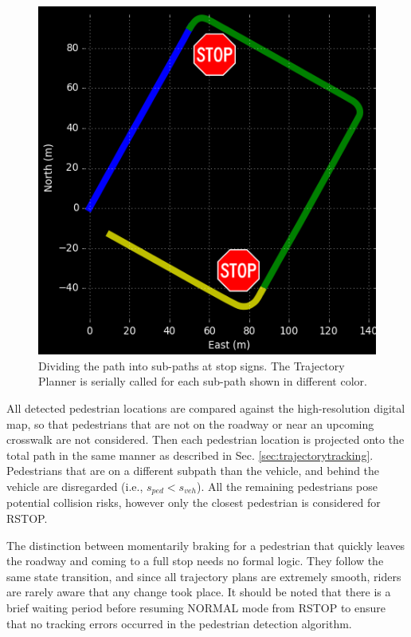 \documentclass[letterpaper, 10 pt, conference]{ieeeconf}  %
\begin{document}
\begin{figure}[thpb]
  \centering
  \includegraphics[width=0.5\columnwidth]{graphics/Subpaths.png}
  \caption{
    Dividing the path into sub-paths at stop signs.
    The Trajectory Planner is serially called for each sub-path shown in different color.
  }
  \label{fig:subpathdivision}
\end{figure}

All detected pedestrian locations are compared against the high-resolution digital map, so that pedestrians that are not on the roadway or near an upcoming crosswalk are not considered.
Then each pedestrian location is projected onto the total path in the same manner as described in Sec. \ref{sec:trajectorytracking}.
Pedestrians that are on a different subpath than the vehicle, and behind the vehicle are disregarded (i.e., $s_{ped} < s_{veh}$).
All the remaining pedestrians pose potential collision risks, however only the closest pedestrian is considered for RSTOP.

The distinction between momentarily braking for a pedestrian that quickly leaves the roadway and coming to a full stop needs no formal logic.
They follow the same state transition, and since all trajectory plans are extremely smooth, riders are rarely aware that any change took place.
It should be noted that there is a brief waiting period before resuming NORMAL mode from RSTOP to ensure that no tracking errors occurred in the pedestrian detection algorithm.
\end{document}
